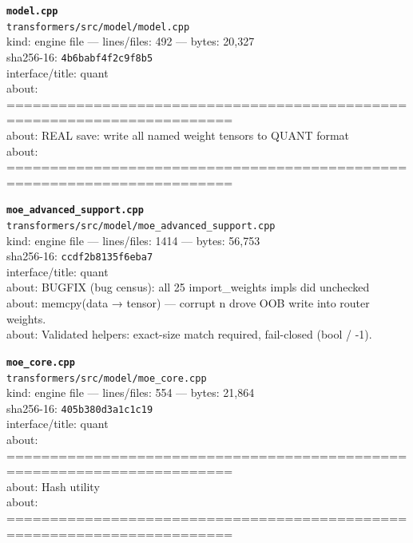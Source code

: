 \noindent\textbf{\texttt{model.cpp}}\\
\texttt{transformers/src/model/model.cpp}\\
kind: engine file --- lines/files: 492 --- bytes: 20,327\\
sha256-16: \texttt{4b6babf4f2c9f8b5}\\
interface/title: quant\\
about: ========================================================================\\
about: REAL save: write all named weight tensors to QUANT format\\
about: ========================================================================\\
\vspace*{6.0pt}
\newpage

\noindent\textbf{\texttt{moe\_advanced\_support.cpp}}\\
\texttt{transformers/src/model/moe\_advanced\_support.cpp}\\
kind: engine file --- lines/files: 1414 --- bytes: 56,753\\
sha256-16: \texttt{ccdf2b8135f6eba7}\\
interface/title: quant\\
about: BUGFIX (bug census): all 25 import\_weights impls did unchecked\\
about: memcpy(data → tensor) — corrupt n drove OOB write into router weights.\\
about: Validated helpers: exact-size match required, fail-closed (bool / -1).\\
\vspace*{6.0pt}

\noindent\textbf{\texttt{moe\_core.cpp}}\\
\texttt{transformers/src/model/moe\_core.cpp}\\
kind: engine file --- lines/files: 554 --- bytes: 21,864\\
sha256-16: \texttt{405b380d3a1c1c19}\\
interface/title: quant\\
about: ========================================================================\\
about: Hash utility\\
about: ========================================================================\\
\vspace*{6.0pt}

